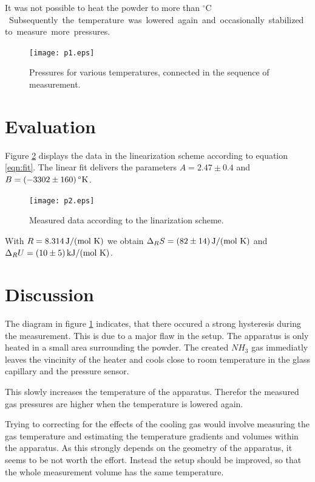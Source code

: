 \documentclass[english,twocolumn,DIV21,a4,10pt]{scrartcl}
\begin{document}
  It was not possible to heat the powder to more than
  \unit[145]{${}^\circ\textrm{C}$}. Subsequently the temperature was
  lowered again and occasionally stabilized to measure more pressures.

  \begin{figure}[htbp]
    \centering
    \texttt{[image: p1.eps]}
    \caption{Pressures for various temperatures, connected in the sequence of measurement.}
    \label{fig:meas}
  \end{figure}

\section{Evaluation}
Figure \ref{fig:eval} displays the data in the linearization scheme
according to equation \eqref{eqn:fit}. The linear fit delivers the
parameters $A=2.47\pm0.4$ and
$B=\unit[(-3302\pm160)]{{}^\circ\textrm{K}}$.
  \begin{figure}[htbp]
    \centering
    \texttt{[image: p2.eps]}
    \caption{Measured data according to the linarization scheme.}
    \label{fig:eval}
  \end{figure}


  With $R=\unit[8.314]{\textrm{J}/(\textrm{mol K})}$ we obtain
  $\Delta_R S=\unit[(82\pm14)]{\textrm{J}/(\textrm{mol K})}$ and
  $\Delta_R U = \unit[(10\pm5)]{\textrm{kJ}/(\textrm{mol K})}$.

\section{Discussion}
The diagram in figure \ref{fig:meas} indicates, that there occured a
strong hysteresis during the measurement. This is due to a major flaw
in the setup. The apparatus is only heated in a small area surrounding
the powder. The created $NH_3$ gas immediatly leaves the vincinity of
the heater and cools close to room temperature in the glass capillary
and the pressure sensor.

This slowly increases the temperature of the apparatus. Therefor the
measured gas pressures are higher when the temperature is lowered
again.

Trying to correcting for the effects of the cooling gas would involve
measuring the gas temperature and estimating the temperature gradients
and volumes within the apparatus. As this strongly depends on the
geometry of the apparatus, it seems to be not worth the effort.
Instead the setup should be improved, so that the whole measurement
volume has the same temperature.
\end{document}
